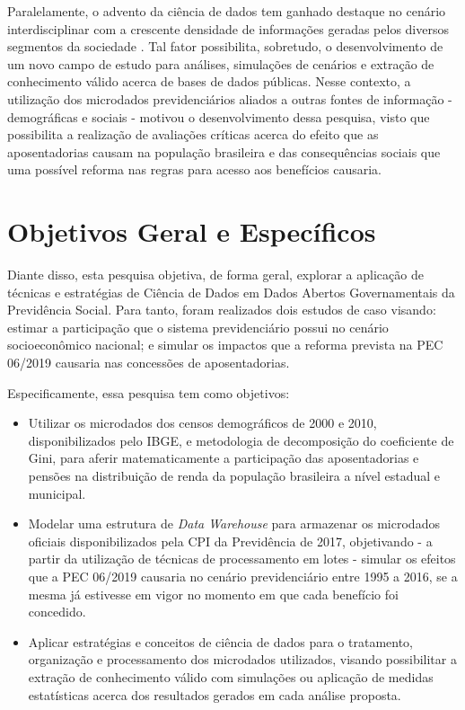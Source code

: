 Paralelamente, o advento da ciência de dados tem ganhado destaque no cenário interdisciplinar com a crescente densidade de informações geradas pelos diversos segmentos da sociedade \cite{cap01_ref5}. Tal fator possibilita, sobretudo, o desenvolvimento de um novo campo de estudo para análises, simulações de cenários e extração de conhecimento válido acerca de bases de dados públicas. Nesse contexto, a utilização dos microdados previdenciários aliados a outras fontes de informação - demográficas e sociais - motivou o desenvolvimento dessa pesquisa, visto que possibilita a realização de avaliações críticas acerca do efeito que as aposentadorias causam na população brasileira e das consequências sociais que uma possível reforma nas regras para acesso aos benefícios causaria.

\section{Objetivos Geral e Específicos}

Diante disso, esta pesquisa objetiva, de forma geral, explorar a aplicação de técnicas e estratégias de Ciência de Dados em Dados Abertos Governamentais da Previdência Social. Para tanto, foram realizados dois estudos de caso visando: estimar a participação que o sistema previdenciário possui no cenário socioeconômico nacional; e simular os impactos que a reforma prevista na PEC 06/2019 causaria nas concessões de aposentadorias. 

Especificamente, essa pesquisa tem como objetivos:

\begin{itemize}
    \item Utilizar os microdados dos censos demográficos de 2000 e 2010, disponibilizados pelo IBGE, e metodologia de decomposição do coeficiente de Gini, para aferir matematicamente a participação das aposentadorias e pensões na distribuição de renda da população brasileira a nível estadual e municipal.
    
    \item Modelar uma estrutura de \textit{Data Warehouse} para armazenar os microdados oficiais disponibilizados pela CPI da Previdência de 2017, objetivando - a partir da utilização de técnicas de processamento em lotes - simular os efeitos que a PEC 06/2019 causaria no cenário previdenciário entre 1995 a 2016, se a mesma já estivesse em vigor no momento em que cada benefício foi concedido.
    
    \item Aplicar estratégias e conceitos de ciência de dados para o tratamento, organização e processamento dos microdados utilizados, visando possibilitar a extração de conhecimento válido com simulações ou aplicação de medidas estatísticas acerca dos resultados gerados em cada análise proposta.
\end{itemize}

